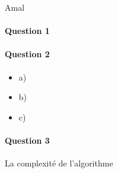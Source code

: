 Amal
\paragraph{Question 1}

\paragraph{Question 2}

\begin{itemize}
\item a)
\item b)
\item c)
\end{itemize}

\paragraph{Question 3}

La complexité de l'algorithme 